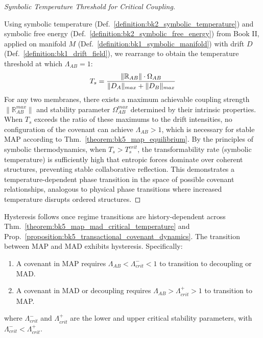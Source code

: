 \begin{proof}[Symbolic Temperature Threshold for Critical Coupling]
\label{proof:bk5_symbolic_temperature_threshold}
\leavevmode

Using symbolic temperature
(Def.~\ref{definition:bk2_symbolic_temperature}) and symbolic free energy
(Def.~\ref{definition:bk2_symbolic_free_energy}) from Book II, applied on
manifold $M$ (Def.~\ref{definition:bk1_symbolic_manifold}) with drift $D$
(Def.~\ref{definition:bk1_drift_field}), we rearrange to obtain the
temperature threshold at which $\Lambda_{AB} = 1$:
\begin{equation}
T_s = \frac{\|\mathbb{R}_{AB}\| \cdot \Omega_{AB}}{\|D_A\|_{max} + \|D_B\|_{max}}
\end{equation}
For any two membranes, there exists a maximum achievable coupling strength $\|\mathbb{R}_{AB}^{max}\|$ and stability parameter $\Omega_{AB}^{max}$ determined by their intrinsic properties. When $T_s$ exceeds the ratio of these maximums to the drift intensities, no configuration of the covenant can achieve $\Lambda_{AB} > 1$, which is necessary for stable MAP according to Thm.~\ref{theorem:bk5_map_equilibrium}.
By the principles of symbolic thermodynamics, when $T_s > T_s^{crit}$, the transformability rate (symbolic temperature) is sufficiently high that entropic forces dominate over coherent structures, preventing stable collaborative reflection. 
This demonstrates a temperature-dependent phase transition in the space of possible covenant relationships, analogous to physical phase transitions where increased temperature disrupts ordered structures.
\end{proof}
\begin{corollary} \label{corollary:bk5_reflective_hysteresis} 
Hysteresis follows once regime transitions are history-dependent across Thm.~\ref{theorem:bk5_map_mad_critical_temperature} and Prop.~\ref{proposition:bk5_transactional_covenant_dynamics}.
The transition between MAP and MAD exhibits hysteresis. Specifically:
\begin{enumerate}
  \item[(i)] A covenant in MAP requires $\Lambda_{AB} < \Lambda_{crit}^- < 1$ to transition to decoupling or MAD.
  \item[(ii)] A covenant in MAD or decoupling requires $\Lambda_{AB} > \Lambda_{crit}^+ > 1$ to transition to MAP.
\end{enumerate}
\noindent where $\Lambda_{crit}^-$ and $\Lambda_{crit}^+$ are the lower and upper critical stability parameters, with $\Lambda_{crit}^- < \Lambda_{crit}^+$.
\end{corollary}
